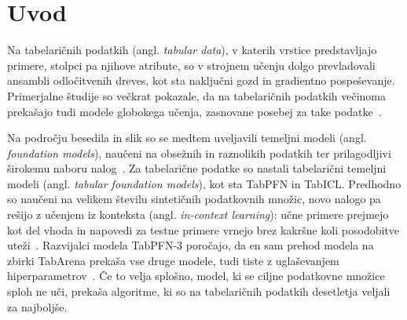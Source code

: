 \documentclass[a4paper,12pt,openright]{book}
\begin{document}


\mainmatter
\setcounter{page}{1}
\pagestyle{fancy}


\chapter{Uvod}
\label{ch:uvod}

Na tabelaričnih podatkih (angl. \emph{tabular data}), v katerih vrstice
predstavljajo primere, stolpci pa njihove atribute, so v strojnem učenju
dolgo prevladovali ansambli odločitvenih dreves, kot sta naključni gozd in
gradientno pospeševanje. Primerjalne študije so večkrat
pokazale, da na tabelaričnih podatkih večinoma prekašajo tudi modele globokega
učenja, zasnovane posebej za take
podatke~\cite{borisov2024deep,grinsztajn2022why,shwartzziv2022tabular}.

Na področju besedila in slik so se medtem uveljavili temeljni modeli (angl.
\emph{foundation models}), naučeni na obsežnih in raznolikih podatkih ter
prilagodljivi širokemu naboru nalog~\cite{bommasani2021opportunities}. Za
tabelarične podatke so nastali tabelarični temeljni modeli (angl.
\emph{tabular foundation models}), kot sta TabPFN in TabICL. Predhodno so
naučeni na velikem številu sintetičnih podatkovnih množic, novo nalogo pa
rešijo z učenjem iz konteksta (angl. \emph{in-context learning}): učne primere
prejmejo kot del vhoda in napovedi za testne primere vrnejo brez kakršne koli
posodobitve uteži~\cite{hollmann2025tabpfn,qu2025tabicl}. Razvijalci modela
TabPFN-3 poročajo, da en sam prehod modela na zbirki TabArena prekaša vse druge
modele, tudi tiste z uglaševanjem hiperparametrov~\cite{grinsztajn2026tabpfn3}. Če to velja splošno, model, ki se ciljne
podatkovne množice sploh ne uči, prekaša algoritme, ki so na tabelaričnih
podatkih desetletja veljali za najboljše.
\end{document}
